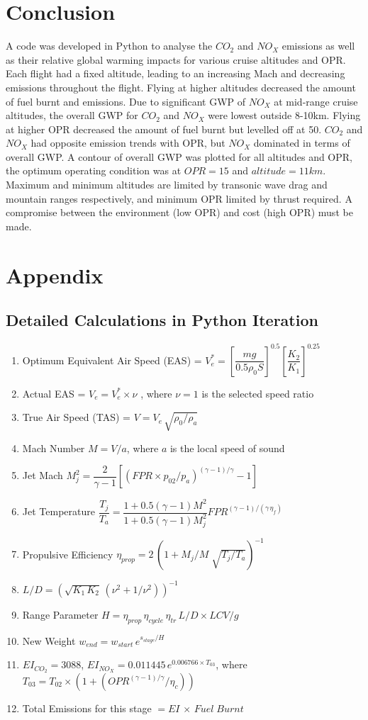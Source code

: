 \documentclass[12pt, a4paper]{article}
\begin{document}
\section{Conclusion}
A code was developed in Python to analyse the $CO_2$ and $NO_X$ emissions as well as their relative global warming impacts for various cruise altitudes and OPR. Each flight had a fixed altitude, leading to an increasing Mach and decreasing emissions throughout the flight. Flying at higher altitudes decreased the amount of fuel burnt and emissions. Due to significant GWP of $NO_X$ at mid-range cruise altitudes, the overall GWP for $CO_2$ and $NO_X$ were lowest outside 8-10km. Flying at higher OPR decreased the amount of fuel burnt but levelled off at 50. $CO_2$ and $NO_X$ had opposite emission trends with OPR, but $NO_X$ dominated in terms of overall GWP. A contour of overall GWP was plotted for all altitudes and OPR, the optimum operating condition was at $OPR=15$ and $altitude=11km$. Maximum  and minimum altitudes are limited by transonic wave drag and mountain ranges respectively, and minimum OPR limited by thrust required. A compromise between the environment (low OPR) and cost (high OPR) must be made.

\newpage
\section{Appendix}\label{sec:Appendix}
\subsection{Detailed Calculations in Python Iteration}
\begin{enumerate}[label=\roman*.]
	\item Optimum Equivalent Air Speed (EAS) = $ V^*_e=\left[ \dfrac{mg}{0.5\rho_0S}\right]^{0.5}\left[\dfrac{K_2}{K_1}\right]^{0.25} $
	\item Actual EAS = $ V_e=V^*_e \times \nu $ , where $\nu=1$ is the selected speed ratio  
	\item True Air Speed (TAS) = $ V=V_e\,\sqrt{\rho_0/\rho_a} $
	\item Mach Number $M=V/a$, where $a$ is the local speed of sound
	\item Jet Mach $M_j^2=\dfrac{2}{\gamma-1}\left[(FPR\times p_{02}/p_a)^{(\gamma-1)/\gamma}-1\right]$
	\item Jet Temperature $ \dfrac{T_j}{T_a}=\dfrac{1+0.5(\gamma-1)M^2}{1+0.5(\gamma-1)M_j^2}FPR^{(\gamma-1)/(\gamma\,\eta_f)} $
	\item Propulsive Efficiency $ \eta_{prop}=2\,\left(1+M_j/M \;\sqrt{T_j/T_a}\right)^{-1} $
	\item $ L/D=\left(\sqrt{K_1\,K_2}\,(\nu^2+1/\nu^2)\right)^{-1} $
	\item Range Parameter $ H=\eta_{prop}\,\eta_{cycle}\,\eta_{tr}\,L/D\times LCV/g $
	\item New Weight $ w_{end} = w_{start} \, e^{s_{stage}/H} $
	\item $EI_{CO_2}=3088$, $ EI_{NO_X}=0.011445\,e^{0.006766\times T_{03}} $, where $T_{03}=T_{02}\times \left(1+(OPR^{(\gamma-1)/\gamma}/\eta_c)\right)$
	\item Total Emissions for this stage $ = EI\,\times \, Fuel\;Burnt$
\end{enumerate}
\end{document}
